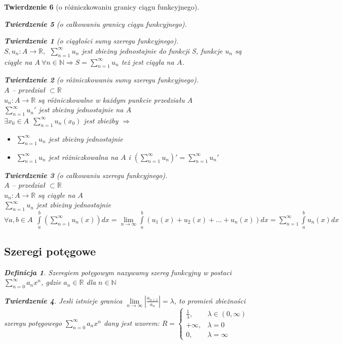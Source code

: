 \documentclass[12pt,a4paper]{article}
\newtheorem{tw}{Twierdzenie}
\theoremstyle{definition}
\newtheorem{df}{Definicja}
\begin{document}
\begin{tw}[o różniczkowaniu granicy ciągu funkcyjnego]
\begin{tw}[o całkowaniu granicy ciągu funkcyjnego]
\begin{tw}[o ciągłości sumy szeregu funkcyjnego]~\\
$S, u_n: A \to \mathbb{R}, ~~ \sum\limits_{n=1}^\infty u_n$ jest zbieżny jednostajnie do funkcji S, funkcje $u_n$ są ciągłe na $A~ \forall n\in\mathbb{N} \Rightarrow S=\sum\limits_{n=1}^\infty u_n$ też jest ciągła na $A$.
\end{tw}

\begin{tw}[o różniczkowaniu sumy szeregu funkcyjnego]~\\
$A$ -- przedział $\subset \mathbb{R}$\\
$u_n: A \to \mathbb{R}$ są różniczkowalne w każdym punkcie przedziału $A$\\
$\sum\limits_{n=1}^\infty u_n'$ jest zbieżny jednostajnie na $A$\\
$\exists x_0\in A ~~ \sum\limits_{n=1}^\infty u_n(x_0)$ jest zbieżby $\Rightarrow$
\begin{itemize}
	\item $\sum\limits_{n=1}^\infty u_n$ jest zbieżny jednostajnie
	\item $\sum\limits_{n=1}^\infty u_n$ jest różniczkowalna na $A$ i $(\sum\limits_{n=1}^\infty u_n)' = \sum\limits_{n=1}^\infty u_n'$
\end{itemize}
\end{tw}

\begin{tw}[o całkowaniu szeregu funkcyjnego]~\\
$A$ -- przedział $\subset \mathbb{R}$\\
$u_n: A \to \mathbb{R}$ są ciągłe na $A$\\
$\sum\limits_{n=1}^\infty u_n$ jest zbieżny jednostajnie\\
$\forall a,b\in A ~~ \int\limits_a^b (\sum\limits_{n=1}^\infty u_n(x))dx = \lim\limits_{n\to\infty}\int\limits_a^b (u_1(x) + u_2(x) + \dots + u_n(x))dx =  \sum\limits_{n=1}^\infty \int\limits_a^b u_n(x)dx$
\end{tw}

\subsection{Szeregi potęgowe}
\begin{df}
Szeregiem potęgowym nazywamy szereg funkcyjny w postaci $\sum\limits_{n=0}^\infty a_nx^n$, gdzie $a_n\in\mathbb{R}$ dla $n\in\mathbb{N}$ 
\end{df}

\begin{tw}
Jesli istnieje granica $\lim\limits_{n\to\infty} |\frac{a_{n+1}}{a_n}| = \lambda $, to promień zbieżności szeregu potęgowego $\sum\limits_{n=0}^\infty a_nx^n$ dany jest wzorem:
$ R = 
	\begin{cases}
		\frac{1}{\lambda}, & \lambda \in (0,\infty)\\
		+\infty, & \lambda = 0\\
		0, & \lambda = \infty
	\end{cases} $
\end{tw}


\end{tw}
\end{tw}
\end{document}
